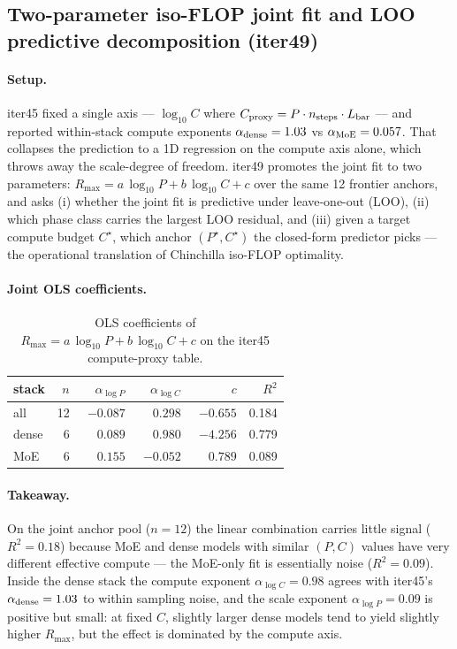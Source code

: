 \subsection{Two-parameter iso-FLOP joint fit and LOO predictive decomposition (iter49)}
\label{sec:scaling-law-iter49}
\paragraph{Setup.}
iter45 fixed a single axis --- $\log_{10}C$ where $C_{\rm proxy}=P\cdot n_{\rm steps}\cdot L_{\rm bar}$ --- and reported within-stack compute exponents $\alpha_{\rm dense}=1.03$ vs $\alpha_{\rm MoE}=0.057$. That collapses the prediction to a 1D regression on the compute axis alone, which throws away the scale-degree of freedom. iter49 promotes the joint fit to two parameters: $R_{\max}=a\,\log_{10}P + b\,\log_{10}C + c$ over the same 12 frontier anchors, and asks (i) whether the joint fit is predictive under leave-one-out (LOO), (ii) which phase class carries the largest LOO residual, and (iii) given a target compute budget $C^{\star}$, which anchor $(P^{\star}, C^{\star})$ the closed-form predictor picks --- the operational translation of Chinchilla iso-FLOP optimality.

\paragraph{Joint OLS coefficients.}
\begin{table}[ht]
\centering\small
\begin{tabular}{lrrrrr}
\toprule
stack & $n$ & $\alpha_{\log P}$ & $\alpha_{\log C}$ & $c$ & $R^2$ \\
\midrule
 all   & 12 & $-0.087$ & $\phantom{-}0.298$ & $-0.655$ & 0.184 \\
 dense &  6 & $\phantom{-}0.089$ & $\phantom{-}0.980$ & $-4.256$ & 0.779 \\
 MoE   &  6 & $\phantom{-}0.155$ & $-0.052$ & $\phantom{-}0.789$ & 0.089 \\
\bottomrule
\end{tabular}
\caption{OLS coefficients of $R_{\max}=a\,\log_{10}P + b\,\log_{10}C + c$ on the iter45 compute-proxy table.}
\end{table}

\paragraph{Takeaway.}
On the joint anchor pool ($n=12$) the linear combination carries little signal ($R^2=0.18$) because MoE and dense models with similar $(P, C)$ values have very different effective compute --- the MoE-only fit is essentially noise ($R^2=0.09$). Inside the dense stack the compute exponent $\alpha_{\log C}=0.98$ agrees with iter45's $\alpha_{\rm dense}=1.03$ to within sampling noise, and the scale exponent $\alpha_{\log P}=0.09$ is positive but small: at fixed $C$, slightly larger dense models tend to yield slightly higher $R_{\max}$, but the effect is dominated by the compute axis.

